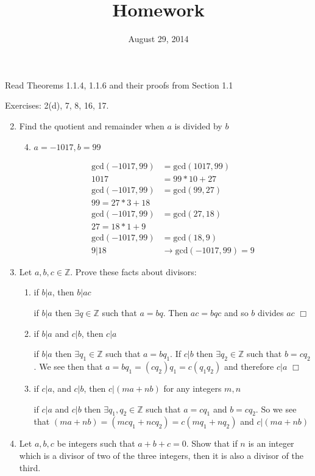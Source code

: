 \documentclass[letterpaper]{article}
\begin{document}
\title{Homework}
\date{August 29, 2014}
\maketitle
Read Theorems 1.1.4, 1.1.6  and their proofs from Section 1.1

Exercises: 2(d), 7, 8, 16, 17.

\begin{enumerate}
\setcounter{enumi}{1}
\item
Find the quotient and remainder when $a$ is divided by $b$
  \begin{enumerate}
  \setcounter{enumii}{3}
  \item
  $a=-1017, b=99$

  \begin{align*}
    \text{gcd}(-1017,99)&=\text{gcd}(1017,99)\\
    1017&=99*10+27\\
    \text{gcd}(-1017,99)&=\text{gcd}(99,27)\\
    99=27*3+18\\
    \text{gcd}(-1017,99)&=\text{gcd}(27,18)\\
    27=18*1+9\\
    \text{gcd}(-1017,99)&=\text{gcd}(18,9)\\
    9\vert18&\rightarrow\text{gcd}(-1017,99)=9
  \end{align*}
  \end{enumerate}
\setcounter{enumi}{6}
\item
Let $a,b,c\in\mathbb{Z}$. Prove these facts about divisors:
  \begin{enumerate}
  \item if $b\vert a$, then $b\vert ac$

  if $b\vert a$ then $\exists q\in\mathbb{Z}$ such that $a=bq$. Then $ac=bqc$ and so $b$ divides $ac$ $\Box$
  \item if $b\vert a$ and $c\vert b$, then $c\vert a$

  if $b\vert a$ then $\exists q_1\in\mathbb{Z}$ such that $a=bq_1$. If $c\vert b$ then $\exists q_2\in\mathbb{Z}$ such that $b=cq_2$. We see then that $a=bq_1=(cq_2)q_1=c(q_1q_2)$ and therefore $c\vert a$ $\Box$
  \item if $c\vert a$, and $c\vert b$, then $c\vert (ma+nb)$ for any integers $m,n$

  if $c\vert a$ and $c\vert b$ then $\exists q_1,q_2\in\mathbb{Z}$ such that $a=cq_1$ and $b=cq_2$. So we see that $(ma+nb)=(mcq_1+ncq_2)=c(mq_1+nq_2)$ and $c\vert (ma+nb)$
  \end{enumerate}
\item
Let $a,b,c$ be integers such that $a+b+c=0$. Show that if $n$ is an integer which is a divisor of two of the three integers, then it is also a divisor of the third.


\end{enumerate}
\end{document}
